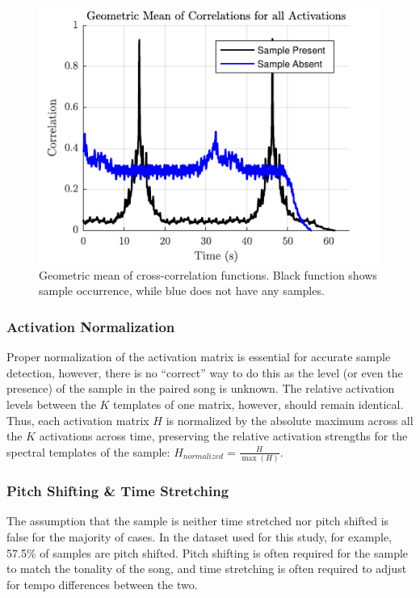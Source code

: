 \documentclass{article}
\begin{document}
\begin{figure}[t]
\centering
\includegraphics[width=\linewidth]{correlation.pdf}
\caption{Geometric mean of cross-correlation functions. Black function shows sample occurrence, while blue does not have any samples.}
\label{fig1}
\end{figure}

\subsubsection{Activation Normalization}%
Proper normalization of the activation matrix is essential for accurate sample detection, however, there is no ``correct'' way to do this as the level (or even the presence) of the sample in the paired song is unknown. The relative activation levels between the $K$ templates of one matrix, however, should remain identical. Thus, each activation matrix $H$ is normalized by the absolute maximum across all the $K$ activations across time, preserving the relative activation strengths for the spectral templates of the sample:
%
$H_{normalized} = \frac{H}{\max(H)}$.

\subsubsection{Pitch Shifting \& Time Stretching}
The assumption that the sample is neither time stretched nor pitch shifted is false for the majority of cases. In the dataset used for this study, for example, 57.5\% of samples are pitch shifted. Pitch shifting is often required for the sample to match the tonality of the song, and time stretching is often required to adjust for tempo differences between the two.
\end{document}
